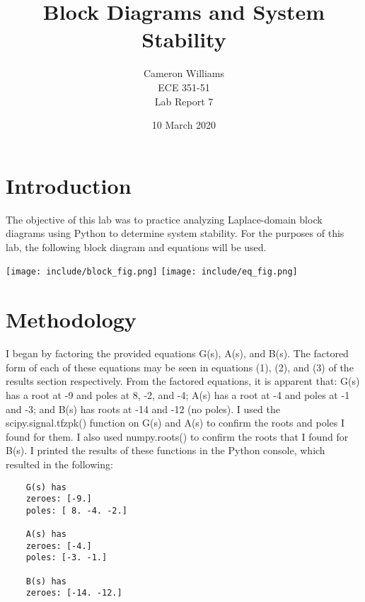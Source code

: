 \documentclass[12pt]{article}
\title{Block Diagrams and System Stability}
\author{Cameron Williams\\ECE 351-51\\Lab Report 7}
\date{10 March 2020}
\begin{document}
\vspace{\fill}
\maketitle
\vspace{\fill}
\clearpage

\newpage
\section{Introduction}
    \par The objective of this lab was to practice analyzing Laplace-domain block diagrams using Python to determine system stability. For the purposes of this lab, the following block diagram and equations will be used.
    \newline
    \begin{center}
    \texttt{[image: include/block\_fig.png]}
    \texttt{[image: include/eq\_fig.png]}
    \end{center}
    
\newpage

\section{Methodology}
    \par I began by factoring the provided equations G(s), A(s), and B(s). The factored form of each of these equations may be seen in equations (1), (2), and (3) of the results section respectively. From the factored equations, it is apparent that: G(s) has a root at -9 and poles at 8, -2, and -4; A(s) has a root at -4 and poles at -1 and -3; and B(s) has roots at -14 and -12 (no poles). I used the scipy.signal.tfzpk() function on G(s) and A(s) to confirm the roots and poles I found for them. I also used numpy.roots() to confirm the roots that I found for B(s). I printed the results of these functions in the Python console, which resulted in the following:
    \begin{verbatim}
    G(s) has 
    zeroes: [-9.]
    poles: [ 8. -4. -2.]

    A(s) has 
    zeroes: [-4.]
    poles: [-3. -1.]

    B(s) has 
    zeroes: [-14. -12.]
    \end{verbatim}
    
\end{document}
